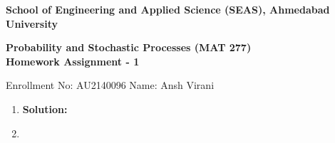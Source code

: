 \documentclass{article}
\begin{document}
\begin{center}
{
\large{\textbf{School of Engineering and Applied Science (SEAS), Ahmedabad University}}\vspace{5mm}
}
\end{center}
%
\begin{center}
\large{
\textbf{Probability and Stochastic Processes (MAT 277)}\\ \vspace{4mm}
\textbf{Homework Assignment - 1} \\\vspace{4mm}
}
\end{center}
Enrollment No: AU2140096 \hspace{4cm} Name: Ansh Virani


\vspace{2mm}


\begin{enumerate}

\item \large \textbf{Solution:}

\item \large 
\end{enumerate}
\end{document}
